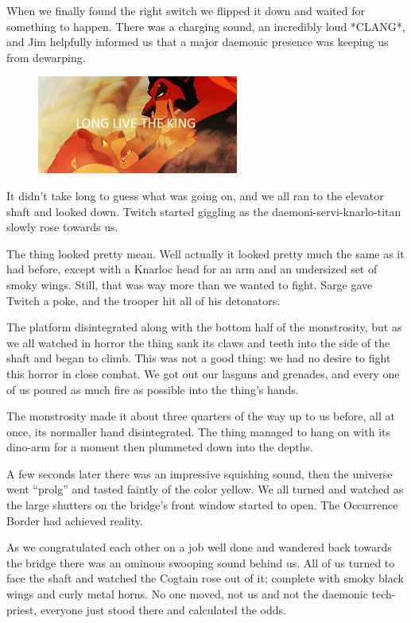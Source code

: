 When we finally found the right switch we flipped it down and waited for something to happen. 
There was a charging sound, an incredibly loud *CLANG*, and Jim helpfully informed us that a major daemonic presence was keeping us from dewarping.

\begin{figure}
	\begin{center}
		\includegraphics[width=\figwidth]{pics/7/46.png}
	\end{center}
\end{figure}
It didn’t take long to guess what was going on, and we all ran to the elevator shaft and looked down. 
Twitch started giggling as the daemoni-servi-knarlo-titan slowly rose towards us.

The thing looked pretty mean. 
Well actually it looked pretty much the same as it had before, except with a  Knarloc head for an arm and an undersized set of smoky wings. 
Still, that was way more than we wanted to fight. 
Sarge gave Twitch a poke, and the trooper hit all of his detonators.

The platform disintegrated along with the bottom half of the monstrosity, but as we all watched in horror the thing sank its claws and teeth into the side of the shaft and began to climb. 
This was not a good thing: 
we had no desire to fight this horror in close combat. 
We got out our lasguns and grenades, and every one of us poured as much fire as possible into the thing’s hands.

The monstrosity made it about three quarters of the way up to us before, all at once, its normaller hand disintegrated. 
The thing managed to hang on with its dino-arm for a moment then plummeted down into the depths. 


A few seconds later there was an impressive squishing sound, then the universe went “prolg” and tasted faintly of the color yellow. 
We all turned and watched as the large shutters on the bridge’s front window started to open. 
The Occurrence Border had achieved reality.

As we congratulated each other on a job well done and wandered back towards the bridge there was an ominous swooping sound behind us. 
All of us turned to face the shaft and watched the Cogtain rose out of it; 
complete with smoky black wings and curly metal horns. 
No one moved, not us and not the daemonic tech-priest, everyone just stood there and calculated the odds.

